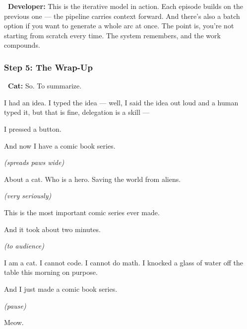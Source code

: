 \documentclass[12pt, letterpaper]{article}
\newcommand{\dev}{\textbf{\color{cogblue}\faIcon{laptop-code}\ Developer:}}
\newcommand{\cat}{\textbf{\color{catpink}\faIcon{cat}\ Cat:}}
\begin{document}
  \begin{developerbox}
    \dev{} This is the iterative model in action. Each episode builds on the
    previous one — the pipeline carries context forward. And there's also a batch
    option if you want to generate a whole arc at once. The point is, you're not
    starting from scratch every time. The system remembers, and the work compounds.
  \end{developerbox}

  \subsubsection{Step 5: The Wrap-Up}

  \begin{catbox}
    \cat{} \large So. To summarize.

    \medskip
    {\large I had an idea. I typed the idea — well, I said the idea out loud and a
    human typed it, but that is fine, delegation is a skill —}

    \medskip
    {\large I pressed a button.}

    \medskip
    {\large And now I have a comic book series.}

    \medskip
    {\large\textit{(spreads paws wide)}}

    \medskip
    {\large About a cat. Who is a hero. Saving the world from aliens.}

    \medskip
    {\large\textit{(very seriously)}}

    \medskip
    {\large This is the most important comic series ever made.}

    \medskip
    {\large And it took about two minutes.}

    \medskip
    {\large\textit{(to audience)}}

    \medskip
    {\large I am a cat. I cannot code. I cannot do math. I knocked a glass of
    water off the table this morning on purpose.}

    \medskip
    {\large And I just made a comic book series.}

    \medskip
    {\large\textit{(pause)}}

    \medskip
    {\large Meow.}
  \end{catbox}

  \newpage

\end{document}
